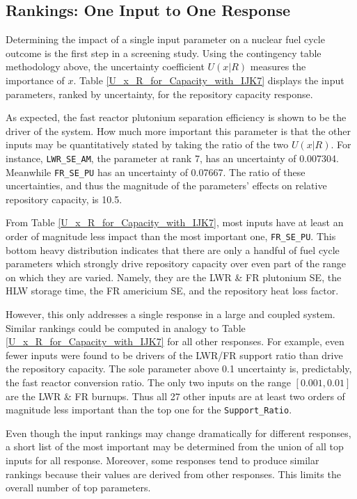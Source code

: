 \documentclass[a4paper, 12pt]{article}
\begin{document}
\subsection{Rankings: One Input to One Response}
\label{sec:rank2D}

Determining the impact of a single input parameter on a nuclear fuel cycle outcome is the first step in a screening study.  Using the contingency table methodology above,
the uncertainty coefficient $U(x|R)$ measures the importance of $x$.  Table \ref{U_x_R_for_Capacity_with_IJK7} displays the input parameters, ranked by
uncertainty, for the repository capacity response.



As expected, the fast reactor plutonium separation efficiency is shown to be the driver of the system.  How much more important this parameter is that the
other inputs may be quantitatively stated by taking the ratio of the two $U(x|R)$.  For instance, \texttt{LWR\_SE\_AM}, the parameter at rank 7,
has an uncertainty of 0.007304.  Meanwhile \texttt{FR\_SE\_PU} has an uncertainty of 0.07667.  The ratio of these uncertainties,
and thus the magnitude of the parameters' effects on relative repository capacity, is 10.5.

From Table \ref{U_x_R_for_Capacity_with_IJK7}, most inputs have at least an order of magnitude less impact than the most important one, \texttt{FR\_SE\_PU}.
This bottom heavy distribution indicates that there are only a handful of fuel cycle parameters which strongly drive
repository capacity over even part of the range on which they are varied.
Namely, they are the LWR \& FR plutonium SE, the HLW storage time, the FR americium SE, and the repository heat loss factor.

However, this only addresses a single response in a large and coupled system.
Similar rankings could be computed in analogy to Table \ref{U_x_R_for_Capacity_with_IJK7} for all other responses.
For example, even fewer inputs were found to be drivers of the LWR/FR support ratio than drive the repository capacity.  The sole parameter above 0.1 uncertainty is, predictably, the fast reactor conversion ratio.
The only two inputs on the range $[0.001, 0.01]$ are the LWR \& FR burnups.  Thus all 27 other inputs are at least two orders of magnitude
less important than the top one for the \texttt{Support\_Ratio}.

Even though the input rankings may change dramatically for different responses, a short list of the most important may be determined from the union of all top
inputs for all response.  Moreover, some responses tend to produce similar rankings because their values are derived from other responses.
This limits the overall number of top parameters.
\end{document}
